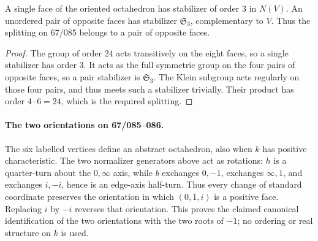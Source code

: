 \begin{proposition}\label{A5-faces}
A single face of the oriented octahedron has stabilizer of order $3$ in $N(V)$. An unordered pair of opposite faces has stabilizer $\mathfrak S_3$, complementary to $V$. Thus the splitting on 67/085 belongs to a pair of opposite faces.
\end{proposition}
\begin{proof}
The group of order $24$ acts transitively on the eight faces, so a single stabilizer has order $3$. It acts as the full symmetric group on the four pairs of opposite faces, so a pair stabilizer is $\mathfrak S_3$. The Klein subgroup acts regularly on those four pairs, and thus meets such a stabilizer trivially. Their product has order $4\cdot6=24$, which is the required splitting.
\end{proof}

\paragraph{The two orientations on 67/085--086.}
The six labelled vertices define an abstract octahedron, also when $k$ has positive characteristic. The two normalizer generators above act as rotations: $h$ is a quarter-turn about the $0,\infty$ axis, while $b$ exchanges $0,-1$, exchanges $\infty,1$, and exchanges $i,-i$, hence is an edge-axis half-turn. Thus every change of standard coordinate preserves the orientation in which $(0,1,i)$ is a positive face. Replacing $i$ by $-i$ reverses that orientation. This proves the claimed canonical identification of the two orientations with the two roots of $-1$; no ordering or real structure on $k$ is used.

